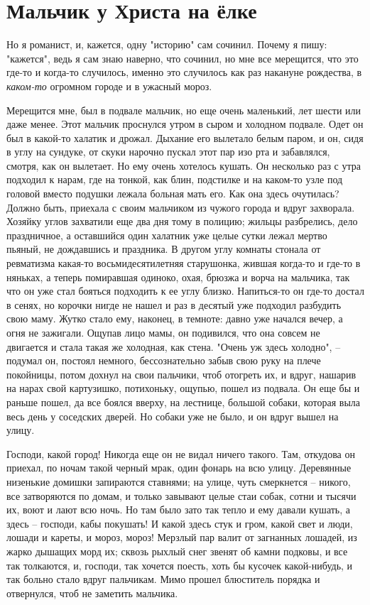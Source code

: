 \documentclass[a4paper, 10pt]{article}
\newcommand{\MyTitle}{\textbf{Мальчик у Христа на ёлке}}
\begin{document}
    \section{\MyTitle}
    
    Но я романист, и, кажется, одну "историю" сам сочинил. Почему я пишу: "кажется", ведь я сам знаю наверно, что сочинил, но мне все мерещится, что это где-то и когда-то случилось, именно это случилось как раз накануне рождества, в \textit{каком-то} огромном городе и в ужасный мороз. 
    
    \vspace{3ex}
    
    Мерещится мне, был в подвале мальчик, но еще очень маленький, лет шести или даже менее. Этот мальчик проснулся утром в сыром и холодном подвале. Одет он был в какой-то халатик и дрожал. Дыхание его вылетало белым паром, и он, сидя в углу на сундуке, от скуки нарочно пускал этот пар изо рта и забавлялся, смотря, как он вылетает. Но ему очень хотелось кушать. Он несколько раз с утра подходил к нарам, где на тонкой, как блин, подстилке и на каком-то узле под головой вместо подушки лежала больная мать его. Как она здесь очутилась? Должно быть, приехала с своим мальчиком из чужого города и вдруг захворала. Хозяйку углов захватили еще два дня тому в полицию; жильцы разбрелись, дело праздничное, а оставшийся один халатник уже целые сутки лежал мертво пьяный, не дождавшись и праздника. В другом углу комнаты стонала от ревматизма какая-то восьмидесятилетняя старушонка, жившая когда-то и где-то в няньках, а теперь помиравшая одиноко, охая, брюзжа и ворча на мальчика, так что он уже стал бояться подходить к ее углу близко. Напиться-то он где-то достал в сенях, но корочки нигде не нашел и раз в десятый уже подходил разбудить свою маму. Жутко стало ему, наконец, в темноте: давно уже начался вечер, а огня не зажигали. Ощупав лицо мамы, он подивился, что она совсем не двигается и стала такая же холодная, как стена. "Очень уж здесь холодно", -- подумал он, постоял немного, бессознательно забыв свою руку на плече покойницы, потом дохнул на свои пальчики, чтоб отогреть их, и вдруг, нашарив на нарах свой картузишко, потихоньку, ощупью, пошел из подвала. Он еще бы и раньше пошел, да все боялся вверху, на лестнице, большой собаки, которая выла весь день у соседских дверей. Но собаки уже не было, и он вдруг вышел на улицу. 
    
    Господи, какой город! Никогда еще он не видал ничего такого. Там, откудова он приехал, по ночам такой черный мрак, один фонарь на всю улицу. Деревянные низенькие домишки запираются ставнями; на улице, чуть смеркнется -- никого, все затворяются по домам, и только завывают целые стаи собак, сотни и тысячи их, воют и лают всю ночь. Но там было зато так тепло и ему давали кушать, а здесь -- господи, кабы покушать! И какой здесь стук и гром, какой свет и люди, лошади и кареты, и мороз, мороз! Мерзлый пар валит от загнанных лошадей, из жарко дышащих морд их; сквозь рыхлый снег звенят об камни подковы, и все так толкаются, и, господи, так хочется поесть, хоть бы кусочек какой-нибудь, и так больно стало вдруг пальчикам. Мимо прошел блюститель порядка и отвернулся, чтоб не заметить мальчика. 
    
\end{document}

